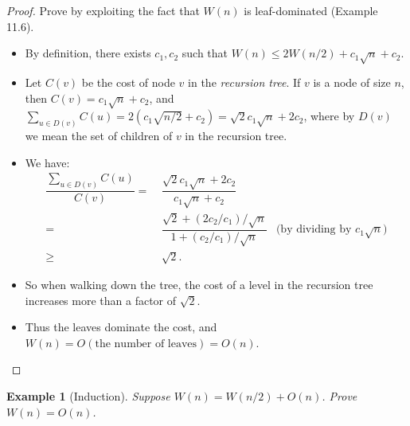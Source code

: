 \documentclass[11pt,a4paper,oneside,microtype,chapter,nokorean]{oblivoir}
\newtheorem{example}{Example}
\begin{document}
\begin{proof}
  Prove by exploiting the fact that $W(n)$ is leaf-dominated (Example 11.6).

  \begin{itemize}
  \item By definition, there exists $c_1,c_2$ such that $W(n) \le 2W(n/2) + c_1 \sqrt{n} + c_2.$
  \item Let $C(v)$ be the cost of node $v$ in the \emph{recursion tree}.  If $v$ is a node of size
    $n$, then $C(v) = c_1 \sqrt{n} + c_2$, and
    $\sum_{u \in D(v)} C(u) = 2(c_1 \sqrt{n/2} + c_2) = \sqrt{2} c_1 \sqrt{n} + 2 c_2$, where by
    $D(v)$ we mean the set of children of $v$ in the recursion tree.
  \item We have:
    \begin{align*}
      \dfrac{\sum_{u \in D(v)} C(u)}{C(v)}
      = &~ \dfrac{\sqrt{2} c_1 \sqrt{n} + 2 c_2}{c_1 \sqrt{n} + c_2} \\
      = &~ \dfrac{\sqrt{2} + (2 c_2 / c_1) / \sqrt{n}}{1 + (c_2 / c_1) / \sqrt{n}} & \mbox{(by dividing by $c_1 \sqrt{n}$)} \\
      \ge &~ \sqrt{2}.
    \end{align*}
  \item So when walking down the tree, the cost of a level in the recursion tree increases more than
    a factor of $\sqrt{2}$.
  \item Thus the leaves dominate the cost, and $W(n) = O(\mbox{the number of leaves}) = O(n)$.
  \end{itemize}
\end{proof}


\begin{example}[Induction] Suppose $W(n) = W(n/2) + O(n)$.  Prove $W(n) = O(n)$.
\end{example}
\end{document}
